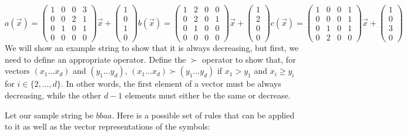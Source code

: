 \[
a(\Vec{x}) = \begin{pmatrix}
1&0&0&3\\
0&0&2&1\\
0&1&0&1\\
0&0&0&0
\end{pmatrix} \Vec{x} + \begin{pmatrix}
1\\
0\\
1\\
0
\end{pmatrix}
b(\Vec{x}) = \begin{pmatrix}
1&2&0&0\\
0&2&0&1\\
0&1&0&0\\
0&0&0&0
\end{pmatrix} \Vec{x} + \begin{pmatrix}
1\\
2\\
0\\
0
\end{pmatrix}
c(\Vec{x}) = \begin{pmatrix}
1&0&0&1\\
0&0&0&1\\
0&1&0&1\\
0&2&0&0
\end{pmatrix} \Vec{x} + \begin{pmatrix}
1\\
0\\
3\\
0
\end{pmatrix}
\]
We will show an example string to show that it is always decreasing, but first, we need to define an appropriate operator. Define the $\succ$ operator to show that, for vectors $(x_1 \ldots x_d)$ and $(y_1 \ldots y_d)$, $(x_1 \ldots x_d) \succ (y_1 \ldots y_d)$ if $x_1 > y_1$ and $x_i \geq y_i$ for $i \in \{2, \ldots, d\}$. In other words, the first element of a vector must be always decreasing, while the other $d-1$ elements must either be the same or decrease. \par
Let our sample string be $bbaa$. Here is a possible set of rules that can be applied to it as well as the vector representations of the symbols:
